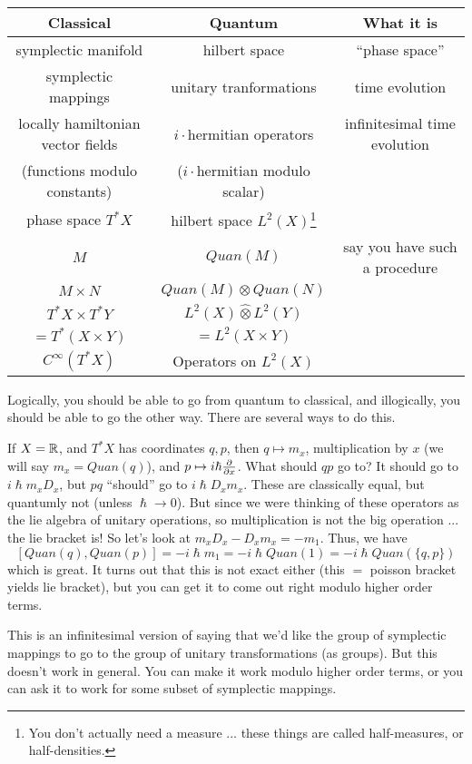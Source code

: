  \hspace{-2cm}\begin{tabular}{c|c|c} \hline
   Classical & Quantum & What it is \\ \hline
   symplectic manifold & hilbert space & ``phase space''\\ \hline
   symplectic mappings & unitary tranformations & time evolution\\ \hline
   locally hamiltonian vector fields & $i\cdot$hermitian operators & infinitesimal time evolution\\
   (functions modulo constants) & ($i\cdot$hermitian modulo scalar)\\ \hline phase
   space $T^*X$ & hilbert space $L^2(X)$\footnote{You don't actually need a measure
   ... these things are called half-measures, or half-densities.} \\ \hline
   $M$ & $Quan(M)$ & say you have such a procedure\\ \hline
   $M\times N$ & $Quan(M)\otimes Quan(N)$ & \\ \hline
   $T^*X\times T^*Y$ & $L^2(X)\widehat{\otimes} L^2(Y)$ \\
   $=T^*(X\times Y)$ & $=L^2(X\times Y)$ \\ \hline
   $C^\infty(T^*X)$ & Operators on $L^2(X)$ \\ \hline
 \end{tabular}
 Logically, you should be able to go from quantum to classical, and illogically, you
 should be able to go the other way.  There are several ways to do this.

 If $X=\mathbb{R}$, and $T^*X$ has coordinates $q,p$, then $q\mapsto m_x$, multiplication by
 $x$ (we will say $m_x=Quan(q)$), and $p\mapsto i\hslash \frac{\partial }{\partial x}$.  What should $qp$ go to?  It should go to
 $i\hslash m_x D_x$, but $pq$ ``should'' go to $i\hslash D_x m_x$.  These are
 classically equal, but quantumly not (unless $\hslash\to 0$).  But since we were
 thinking of these operators as the lie algebra of unitary operations, so
 multiplication is not the big operation ... the lie bracket is!  So let's look at
 $m_x D_x - D_x m_x = -m_1$.  Thus, we have
 \[
    [Quan(q), Quan(p)] = -i\hslash m_1 = -i\hslash Quan(1) = -i\hslash Quan(\{q,p\})
 \]
 which is great.  It turns out that this is not exact either (this $=$ poisson bracket
 yields lie bracket), but you can get it to come out right modulo higher order terms.

 This is an infinitesimal version of saying that we'd like the group of symplectic
 mappings to go to the group of unitary transformations (as groups).  But this doesn't
 work in general.  You can make it work modulo higher order terms, or you can ask it
 to work for some subset of symplectic mappings.

